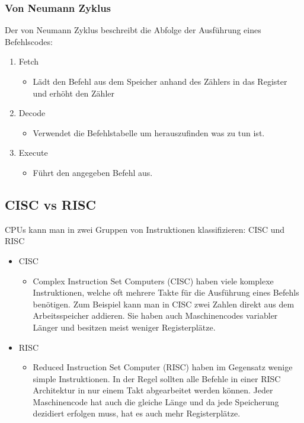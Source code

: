 \documentclass{article}
\begin{document}
	\subsubsection{Von Neumann Zyklus}
	Der von Neumann Zyklus beschreibt die Abfolge der Ausführung eines Befehlscodes:
	\begin{enumerate}
		\item{Fetch}
		\begin{itemize}
			\item{Lädt den Befehl aus dem Speicher anhand des Zählers in das Register und erhöht den Zähler}
		\end{itemize}
		\item{Decode}
		\begin{itemize}
			\item{Verwendet die Befehlstabelle um herauszufinden was zu tun ist.}
		\end{itemize}
		\item{Execute}
		\begin{itemize}
			\item{Führt den angegeben Befehl aus.}
		\end{itemize}
	\end{enumerate}
	\subsection{CISC vs RISC}
	CPUs kann man in zwei Gruppen von Instruktionen klassifizieren: CISC und RISC
	\begin{itemize}
		\item{CISC}
		\begin{itemize}
			\item{Complex Instruction Set Computers (CISC) haben viele komplexe Instruktionen, welche oft mehrere Takte für die Ausführung eines Befehls benötigen. Zum Beispiel kann man in CISC zwei Zahlen direkt aus dem Arbeitsspeicher addieren. Sie haben auch Maschinencodes variabler Länger und besitzen meist weniger Registerplätze.}
		\end{itemize}
		\item{RISC}
		\begin{itemize}
			\item{Reduced Instruction Set Computer (RISC) haben im Gegensatz wenige simple Instruktionen. In der Regel sollten alle Befehle in einer RISC Architektur in nur einem Takt abgearbeitet werden können. Jeder Maschinencode hat auch die gleiche Länge und da jede Speicherung dezidiert erfolgen muss, hat es auch mehr Registerplätze.}
		\end{itemize}
	\end{itemize}
\end{document}
